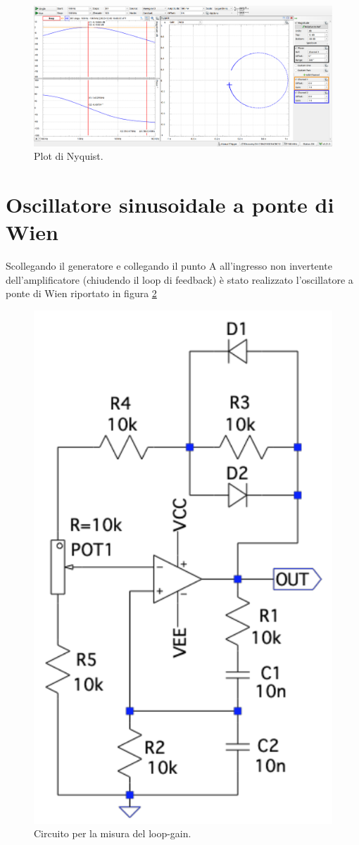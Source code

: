\documentclass[10pt,a4paper]{article}
\begin{document}
\begin{figure}[h]
    \begin{center}
    \includegraphics[width=0.7\linewidth]{Nyquist1.png}
    \caption{\small Plot di Nyquist.}
    \label{fig:Nyquist1}
    \end{center}
\end{figure}

\section{Oscillatore sinusoidale a ponte di Wien}

Scollegando il generatore e collegando il punto A all'ingresso non invertente
dell'amplificatore (chiudendo il loop di feedback) è stato realizzato l'oscillatore a
ponte di Wien riportato in figura \ref{fig:circuitooscillatoreponteWien}

\begin{figure}[h]
    \begin{center}
    \includegraphics[width=0.4\linewidth]{circuitooscillatoreponteWien.png}
    \caption{\small Circuito per la misura del loop-gain.}
    \label{fig:circuitooscillatoreponteWien}
    \end{center}
\end{figure}
\end{document}
